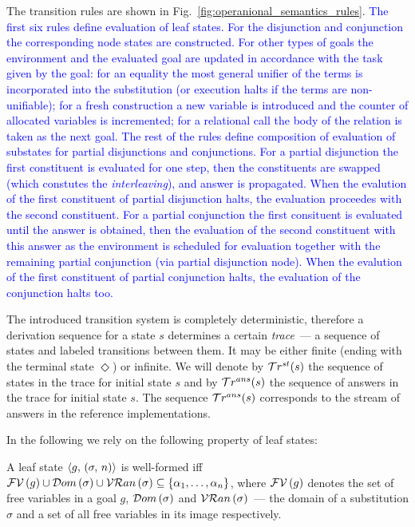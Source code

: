 The transition rules are shown in Fig.~\ref{fig:operanional_semantics_rules}.
\textcolor{blue}{
The first six rules define evaluation of leaf states.
For the disjunction and conjunction the corresponding node states are constructed.
For other types of goals the environment and the evaluated goal are updated in accordance with the task given by the goal: for an equality the most general unifier of the terms is incorporated into the substitution (or execution halts if the terms are non-unifiable); for a fresh construction a new variable is introduced and the counter of allocated variables is incremented; for a relational call the body of the relation is taken as the next goal.
The rest of the rules define composition of evaluation of substates for partial disjunctions and conjunctions.
For a partial disjunction the first constituent is evaluated for one step, then the constituents are swapped (which constutes the \emph{interleaving}), and answer is propagated.
When the evalution of the first constituent of partial disjunction halts, the evaluation proceedes with the second constituent.
For a partial conjunction the first consituent is evaluated until the answer is obtained, then the evaluation of the second constituent with this answer as the environment is scheduled for evaluation together with the remaining partial conjunction (via partial disjunction node).
When the evalution of the first constituent of partial conjunction halts, the evaluation of the conjunction halts too.
}

The introduced transition system is completely deterministic,
therefore a derivation sequence for a state $s$ determines a certain \emph{trace}~--- a sequence of states and labeled transitions between
them. It may be either finite (ending with the terminal state $\Diamond$) or infinite. We will denote by $\mathcal{T}r^{st}(s)$ the sequence of states in
the trace for initial state $s$ and by $\mathcal{T}r^{ans}(s)$ the sequence of answers in the trace for initial state $s$. The sequence $\mathcal{T}r^{ans}(s)$ corresponds
to the stream of answers in the reference \mK implementations.

In the following we rely on the following property of leaf states:

\begin{definition}
  A leaf state $\langle g ,\, (\sigma ,\, n) \rangle$ is well-formed iff $\mathcal{FV}\,({g})\cup\mathcal{D}om\,(\sigma)\cup\mathcal{VR}an\,(\sigma)\subseteq\{\alpha_1,\dots,\alpha_n\}$, where
  $\mathcal{FV}\,({g})$ denotes the set of free variables in a goal $g$, $\mathcal{D}om\,(\sigma)$ and $\mathcal{VR}an\,(\sigma)$~--- the domain of a substitution $\sigma$ and
  a set of all free variables in its image respectively.
\end{definition}

